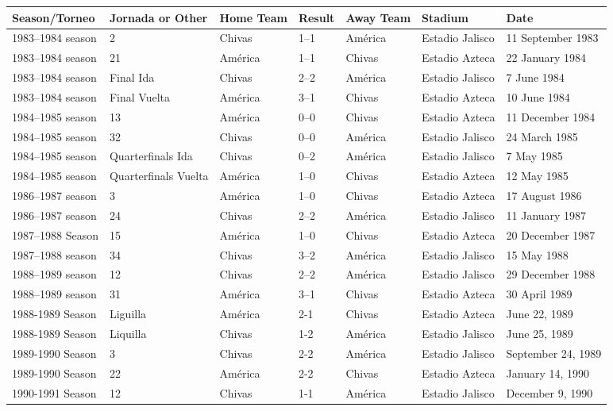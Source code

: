 \documentclass{article}
\begin{document}
\begin{tabular}{lllllll}
\toprule
Season/Torneo & Jornada or Other & Home Team & Result & Away Team & Stadium & Date \\
\midrule
1983–1984 season & 2 & Chivas & 1–1 & América & Estadio Jalisco & 11 September 1983 \\
1983–1984 season & 21 & América & 1–1 & Chivas & Estadio Azteca & 22 January 1984 \\
1983–1984 season & Final Ida & Chivas & 2–2 & América & Estadio Jalisco & 7 June 1984 \\
1983–1984 season & Final Vuelta & América & 3–1 & Chivas & Estadio Azteca & 10 June 1984 \\
1984–1985 season & 13 & América & 0–0 & Chivas & Estadio Azteca & 11 December 1984 \\
1984–1985 season & 32 & Chivas & 0–0 & América & Estadio Jalisco & 24 March 1985 \\
1984–1985 season & Quarterfinals Ida & Chivas & 0–2 & América & Estadio Jalisco & 7 May 1985 \\
1984–1985 season & Quarterfinals Vuelta & América & 1–0 & Chivas & Estadio Azteca & 12 May 1985 \\
1986–1987 season & 3 & América & 1–0 & Chivas & Estadio Azteca & 17 August 1986 \\
1986–1987 season & 24 & Chivas & 2–2 & América & Estadio Jalisco & 11 January 1987 \\
1987–1988 Season & 15 & América & 1–0 & Chivas & Estadio Azteca & 20 December 1987 \\
1987–1988 season & 34 & Chivas & 3–2 & América & Estadio Jalisco & 15 May 1988 \\
1988–1989 season & 12 & Chivas & 2–2 & América & Estadio Jalisco & 29 December 1988 \\
1988–1989 season & 31 & América & 3–1 & Chivas & Estadio Azteca & 30 April 1989 \\
1988-1989 Season & Liguilla & América & 2-1 & Chivas & Estadio Azteca & June 22, 1989 \\
1988-1989 Season & Liquilla & Chivas & 1-2 & América & Estadio Jalisco & June 25, 1989 \\
1989-1990 Season & 3 & Chivas & 2-2 & América & Estadio Jalisco & September 24, 1989 \\
1989-1990 Season & 22 & América & 2-2 & Chivas & Estadio Azteca & January 14, 1990 \\
1990-1991 Season & 12 & Chivas & 1-1 & América & Estadio Jalisco & December 9, 1990 \\

\end{tabular}
\end{document}
